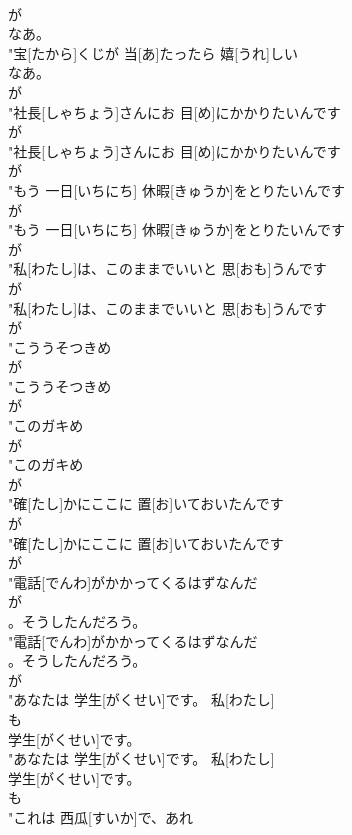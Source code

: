 \documentclass[8pt]{extreport}
\begin{document}
\begin{CJK}{UTF8}{min}
\\	が
\\	なあ。
\\	"宝[たから]くじが 当[あ]たったら 嬉[うれ]しい
\\	なあ。
\\	が
\\	"社長[しゃちょう]さんにお 目[め]にかかりたいんです
\\	が
\\	"社長[しゃちょう]さんにお 目[め]にかかりたいんです
\\	が
\\	"もう 一日[いちにち] 休暇[きゅうか]をとりたいんです
\\	が
\\	"もう 一日[いちにち] 休暇[きゅうか]をとりたいんです
\\	が
\\	"私[わたし]は、このままでいいと 思[おも]うんです
\\	が
\\	"私[わたし]は、このままでいいと 思[おも]うんです
\\	が
\\	"こううそつきめ
\\	が
\\	"こううそつきめ
\\	が
\\	"このガキめ
\\	が
\\	"このガキめ
\\	が
\\	"確[たし]かにここに 置[お]いておいたんです
\\	が
\\	"確[たし]かにここに 置[お]いておいたんです
\\	が
\\	"電話[でんわ]がかかってくるはずなんだ
\\	が
\\	。そうしたんだろう。
\\	"電話[でんわ]がかかってくるはずなんだ
\\	。そうしたんだろう。
\\	が
\\	"あなたは 学生[がくせい]です。 私[わたし]
\\	も
\\	学生[がくせい]です。
\\	"あなたは 学生[がくせい]です。 私[わたし]
\\	学生[がくせい]です。
\\	も
\\	"これは 西瓜[すいか]で、あれ

\end{CJK}
\end{document}
